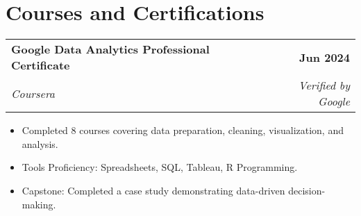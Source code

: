 \documentclass[letterpaper,11pt]{article}
\makeatletter
\newcommand{\resumeItem}[1]{
  \item\small{
    {#1 \vspace{-2pt}}
  }
}
\newcommand{\resumeSubheading}[4]{
  \vspace{-2pt}\item
    \begin{tabular*}{1.0\textwidth}[t]{l@{\extracolsep{\fill}}r}
      \textbf{#1} & \textbf{\small #2} \\
      \textit{\small#3} & \textit{\small #4} \\
    \end{tabular*}\vspace{-7pt}
}
\newcommand{\resumeItemListStart}{\begin{itemize}}
\newcommand{\resumeItemListEnd}{\end{itemize}\vspace{-5pt}}
\makeatother
\begin{document}
\section{Courses and Certifications}
    \resumeSubHeadingListStart
        \resumeSubheading{Google Data Analytics Professional Certificate}{Jun 2024}{Coursera}{Verified by Google}
            \resumeItemListStart
                \resumeItem{Completed 8 courses covering data preparation, cleaning, visualization, and analysis.}
                \resumeItem{Tools Proficiency: Spreadsheets, SQL, Tableau, R Programming.}
                \resumeItem{Capstone: Completed a case study demonstrating data-driven decision-making.}
            \resumeItemListEnd
    \resumeSubHeadingListEnd
\end{document}
